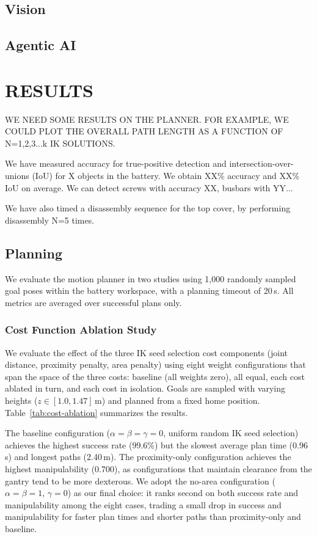 \documentclass[letterpaper, 10 pt, conference]{ieeeconf}  %
\begin{document}
\subsection{Vision}\label{sec:vision}
\subsection{Agentic AI}\label{sec:agenticAI}

\section{RESULTS}
WE NEED SOME RESULTS ON THE PLANNER. FOR EXAMPLE, WE COULD PLOT THE OVERALL PATH LENGTH AS A FUNCTION OF N=1,2,3...k IK SOLUTIONS.

We have measured accuracy for true-positive detection and intersection-over-unions (IoU) for X objects in the battery. We obtain XX\% accuracy and XX\% IoU on average. We can detect screws with accuracy XX, busbars with YY...

We have also timed a disassembly sequence for the top cover, by performing disassembly N=5 times. 


\subsection{Planning}
We evaluate the motion planner in two studies using 1{,}000 randomly sampled goal poses within the battery workspace, with a planning timeout of 20\,s. All metrics are averaged over successful plans only.

\subsubsection{Cost Function Ablation Study}
We evaluate the effect of the three IK seed selection cost components (joint distance, proximity penalty, area penalty) using eight weight configurations that span the space of the three costs: baseline (all weights zero), all equal, each cost ablated in turn, and each cost in isolation. Goals are sampled with varying heights ($z \in [1.0, 1.47]$\,m) and planned from a fixed home position. Table~\ref{tab:cost-ablation} summarizes the results.



The baseline configuration ($\alpha = \beta = \gamma = 0$, uniform random IK seed selection) achieves the highest success rate (99.6\%) but the slowest average plan time (0.96\,s) and longest paths (2.40\,m). The proximity-only configuration achieves the highest manipulability (0.700), as configurations that maintain clearance from the gantry tend to be more dexterous. We adopt the no-area configuration ($\alpha = \beta = 1$, $\gamma = 0$) as our final choice: it ranks second on both success rate and manipulability among the eight cases, trading a small drop in success and manipulability for faster plan times and shorter paths than proximity-only and baseline.
\end{document}
